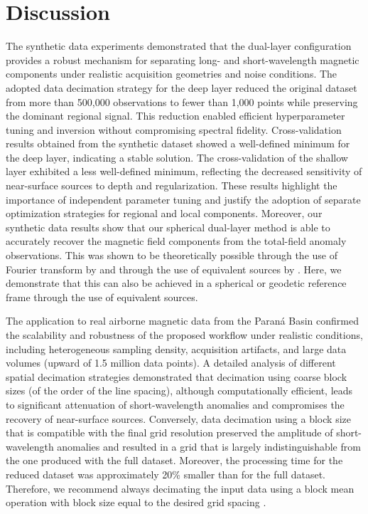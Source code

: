 \section{Discussion}

The synthetic data experiments demonstrated that the dual-layer configuration
provides a robust mechanism for separating long- and short-wavelength
magnetic components under realistic acquisition geometries and noise
conditions. The adopted data decimation strategy for the deep layer reduced
the original dataset from more than 500,000 observations to fewer than 1,000
points while preserving the dominant regional signal. This reduction enabled
efficient hyperparameter tuning and inversion without compromising spectral
fidelity.
Cross-validation results obtained from the synthetic dataset showed a
well-defined minimum for the deep layer, indicating a stable solution.
The cross-validation of the shallow layer exhibited a less well-defined
minimum, reflecting the decreased sensitivity of near-surface sources to
depth and regularization. These results highlight the importance of
independent parameter tuning and justify the adoption of separate
optimization strategies for regional and local components.
Moreover, our synthetic data results show that our spherical dual-layer
method is able to accurately recover the magnetic field components from the
total-field anomaly observations. This was shown to be theoretically possible
through the use of Fourier transform by \citet{Lima2009} and through the use
of equivalent sources by \citet{Li2020}. Here, we demonstrate that this can
also be achieved in a spherical or geodetic reference frame through the use
of equivalent sources.

The application to real airborne magnetic data from the Paraná Basin confirmed
the scalability and robustness of the proposed workflow under realistic
conditions, including heterogeneous sampling density, acquisition artifacts,
and large data volumes (upward of 1.5 million data points). A detailed
analysis of different spatial decimation strategies demonstrated that
decimation using coarse block sizes (of the order of the line spacing),
although computationally efficient, leads to significant attenuation of
short-wavelength anomalies and compromises the recovery of near-surface
sources. Conversely, data decimation using a block size that is compatible
with the final grid resolution preserved the amplitude of short-wavelength
anomalies and resulted in a grid that is largely indistinguishable from the
one produced with the full dataset. Moreover, the processing time for the
reduced dataset was approximately 20\% smaller than for the full dataset.
Therefore, we recommend always decimating the input data using a block mean
operation with block size equal to the desired grid spacing \citep{Smith1990}.

